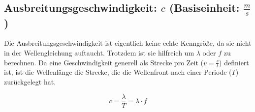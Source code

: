 \subsection[Ausbreitungsgeschwindigkeit]{Ausbreitungsgeschwindigkeit: $c$ (Basiseinheit: $\frac{m}{s}$)}

\noindent Die Ausbreitungsgeschwindigkeit ist eigentlich keine echte Kenngröße, da sie nicht in der Wellengleichung auftaucht. Trotzdem ist sie hilfreich um $\lambda$ oder $f$ zu berechnen. Da eine Geschwindigkeit generell als Strecke pro Zeit ($v=\frac{s}{t}$) definiert ist, ist die Wellenlänge die Strecke, die die Wellenfront nach einer Periode ($T$) zurückgelegt hat.

\begin{equation} \label{eq:wellen_c}
	c=\frac{\lambda}{T}=\lambda \cdot f
\end{equation}